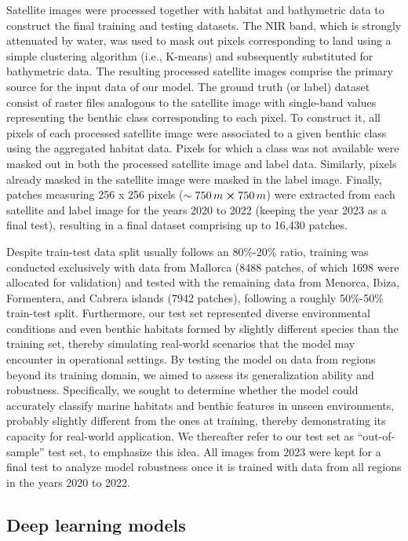 Satellite images were processed together with habitat and bathymetric data to
construct the final training and testing datasets. The NIR band, which is
strongly attenuated by water, was used to mask out pixels corresponding to land
using a simple clustering algorithm (i.e., K-means) and subsequently
substituted
for bathymetric data. The resulting processed
satellite images comprise the primary source for the input data of our model.
The ground truth (or label) dataset consist of raster files analogous to the
satellite image with single-band values representing the benthic class
corresponding to each pixel. To construct it, all pixels of each processed
satellite image were associated to a given benthic class using the aggregated
habitat data. Pixels for which a class was not available were masked out in
both the processed satellite image and label data. Similarly, pixels already
masked in the satellite image were masked in the label image. Finally, patches
measuring 256 x 256 pixels ($\sim 750\,m \cross 750\,m$) were extracted from
each satellite and label image for the years 2020 to 2022 (keeping the year
2023 as a final test), resulting in a final dataset comprising up to
16,430 patches.

Despite train-test data split usually follows an 80\%-20\% ratio, training was
conducted exclusively with data from Mallorca (8488
patches, of which 1698 were allocated for validation) and tested with the
remaining data from Menorca, Ibiza, Formentera, and Cabrera islands (7942
patches), following a roughly 50\%-50\% train-test split. Furthermore, our
test set represented diverse environmental conditions and even benthic habitats
formed by slightly different species than the training set, thereby simulating
real-world scenarios that the model may encounter in operational settings. By
testing the model on data from regions beyond its training domain, we aimed to
assess its generalization ability and robustness. Specifically, we sought to
determine whether the model could accurately classify marine habitats and
benthic features in unseen environments, probably slightly different from the
ones at training, thereby demonstrating its capacity for real-world
application. We thereafter refer to our test set as ``out-of-sample'' test set,
to emphasize this idea. All images from 2023 were kept for a final test to
analyze model robustness once it is trained with data from all regions in the
years 2020 to 2022.

\subsection{Deep learning models}

